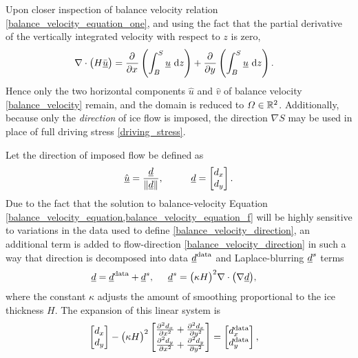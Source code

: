Upon closer inspection of balance velocity relation \cref{balance_velocity_equation_one}, and using the fact that the partial derivative of the vertically integrated velocity with respect to $z$ is zero,
\begin{align*}
  \nabla \cdot \big( H \bar{\rankone{u}} \big) &= \parder{}{x} \left( \int_B^S \rankone{u} \d{z} \right)
     + \parder{}{y} \left( \int_B^S \rankone{u} \d{z} \right).
\end{align*}
Hence only the two horizontal components $\hat{u}$ and $\hat{v}$ of balance velocity \cref{balance_velocity} remain, and the domain is reduced to $\Omega \in \R^2$.  Additionally, because only the \emph{direction} of ice flow is imposed, the direction $\nabla S$ may be used in place of full driving stress \cref{driving_stress}.

Let the direction of imposed flow be defined as
\begin{align}
  \label{balance_velocity_direction}
  \hat{\rankone{u}} = \frac{\rankone{d}}{\Vert \rankone{d} \Vert}, \hspace{10mm} 
  \rankone{d} = \begin{bmatrix}
                 d_x \\
                 d_y \\
               \end{bmatrix}.
\end{align}
Due to the fact that the solution to balance-velocity Equation \cref{balance_velocity_equation,balance_velocity_equation_f} will be highly sensitive to variations in the data used to define \cref{balance_velocity_direction}, an additional term is added to flow-direction \cref{balance_velocity_direction} in such a way that direction is decomposed into data $\rankone{d}^{\text{data}}$ and Laplace-blurring $\rankone{d}^s$ terms \citep{brinkerhoff_2015}
\begin{align*}
  \rankone{d} &= \rankone{d}^{\text{data}} + \rankone{d}^s, \hspace{5mm} \rankone{d}^s = \big( \kappa H \big)^2 \nabla \cdot \big( \nabla \rankone{d} \big),
\end{align*}
where the constant $\kappa$ adjusts the amount of smoothing proportional to the ice thickness $H$.  The expansion of this linear system is
\begin{align*}
  \begin{bmatrix}
    d_x \\
    d_y
  \end{bmatrix} - \big( \kappa H \big)^2
  \begin{bmatrix}
    \parder[2]{d_x}{x} + \parder[2]{d_x}{y} \\ 
    \parder[2]{d_y}{x} + \parder[2]{d_y}{y}
  \end{bmatrix} &=
  \begin{bmatrix}
     d_x^{\text{data}} \\
     d_y^{\text{data}}
  \end{bmatrix},
\end{align*}
